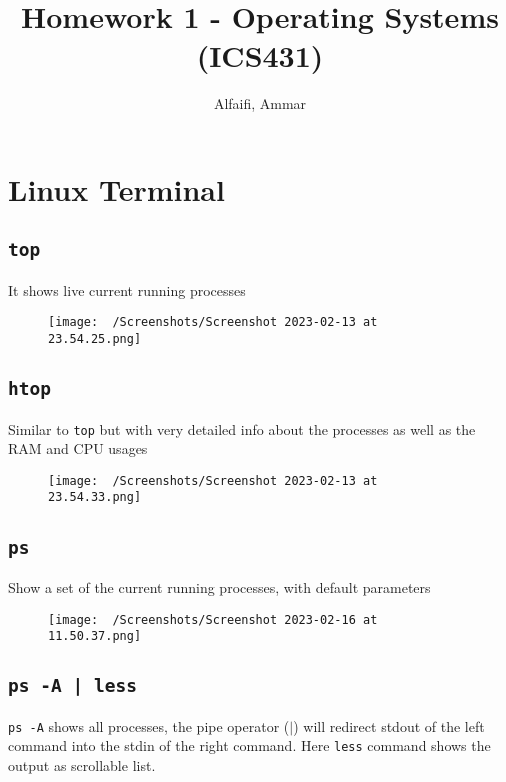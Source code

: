 \documentclass{article}
\title{Homework 1 - Operating Systems (ICS431)}
\author{Alfaifi, Ammar}
\date{}
\def\code#1{\texttt{#1}}
\begin{document}
\maketitle

\section{Linux Terminal}%
\subsection{\code{top}}%

It shows live current running processes

\begin{figure}[ht]
  \centering
  \texttt{[image: ~/Screenshots/Screenshot 2023-02-13 at 23.54.25.png]}
\end{figure}


\subsection{\code{htop}}%

Similar to \code{top} but with very detailed info about the processes as well as
the RAM and CPU usages

\begin{figure}[ht]
  \centering
  \texttt{[image: ~/Screenshots/Screenshot 2023-02-13 at 23.54.33.png]}
\end{figure}

\newpage

\subsection{\code{ps}}%
Show a set of the current running processes, with default parameters

\begin{figure}[ht]
  \centering
  \texttt{[image: ~/Screenshots/Screenshot 2023-02-16 at 11.50.37.png]}
\end{figure}


\subsection{\code{ps -A | less}}%
\code{ps -A} shows all processes, the pipe operator ($|$) will redirect stdout of the left
command into the stdin of the right command. Here \code{less} command shows the output as
scrollable list.
\end{document}
